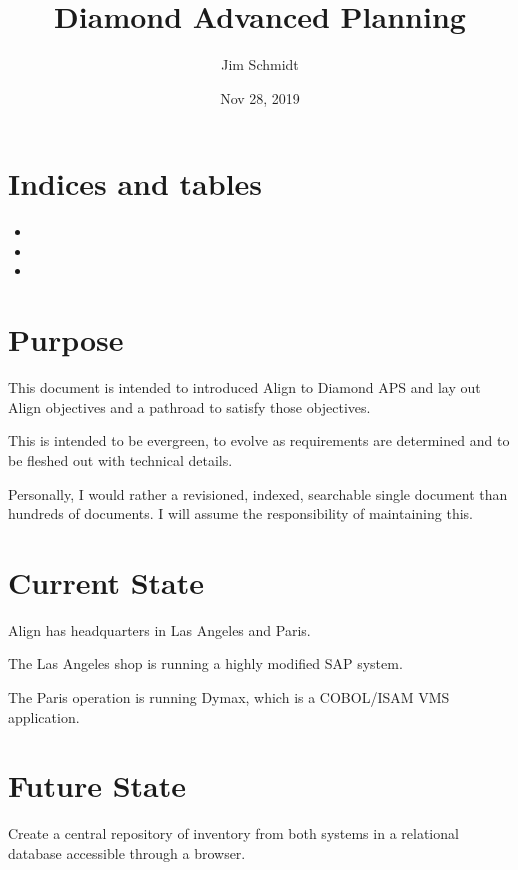 \documentclass[letterpaper,10pt,english]{sphinxmanual}
\title{Diamond Advanced Planning}
\date{Nov 28, 2019}
\author{Jim Schmidt}
\begin{document}
\pagestyle{empty}
\sphinxmaketitle
\pagestyle{plain}
\sphinxtableofcontents
\pagestyle{normal}
\label{\detokenize{index::doc}}



\chapter{Indices and tables}
\label{\detokenize{index:indices-and-tables}}\begin{itemize}
\item {} 

\item {} 

\item {} 

\end{itemize}


\chapter{Purpose}
\label{\detokenize{index:purpose}}
This document is intended to introduced Align to Diamond APS and lay out
Align objectives and a pathroad to satisfy those objectives.

This is intended to be evergreen, to evolve as requirements are determined and to be
fleshed out with technical details.

Personally, I would rather a revisioned, indexed, searchable single document than hundreds of
documents.  I will assume the responsibility of maintaining this.


\chapter{Current State}
\label{\detokenize{index:current-state}}
Align has headquarters in Las Angeles and Paris.

The Las Angeles shop is running a highly modified SAP system.

The Paris operation is running Dymax, which is a COBOL/ISAM VMS application.


\chapter{Future State}
\label{\detokenize{index:future-state}}
Create a central repository of inventory from both systems in a relational
database accessible through a browser.
\end{document}
